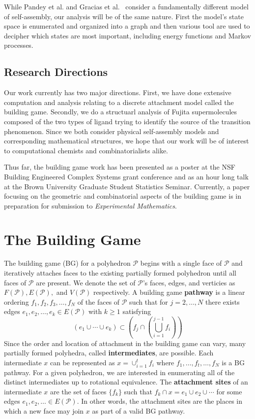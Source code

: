 \documentclass[12pt]{article}
\begin{document}
While Pandey et al. and Gracias et al.~\cite{Pandey2011,Gracias2013} consider a fundamentally different model of self-assembly, our analysis will be of the same nature. First the model's state space is enumerated and organized into a graph and then various tool are used to decipher which states are most important, including energy functions and Markov processes.

\subsection{Research Directions}

Our work currently has two major directions. First, we have done extensive computation and analysis relating to a discrete attachment model called the building game. Secondly, we do a structuarl analysis of Fujita supermolecules composed of the two types of ligand trying to identify the source of the transition phenomenon. Since we both consider physical self-assembly models and corresponding mathematical structures, we hope that our work will be of interest to computational chemists and combinatorialists alike. 

Thus far, the building game work has been presented as a poster at the NSF Building Engineered Complex Systems grant conference and as an hour long talk at the Brown University Graduate Student Statistics Seminar. Currently, a paper focusing on the geometric and combinatorial aspects of the building game is in preparation for submission to \textit{Experimental Mathematics}.

\section{The Building Game}
 The building game (BG) for a polyhedron $\mathcal{P}$ begins with a single face of $\mathcal{P}$ and iteratively attaches faces to the existing partially formed polyhedron until all faces of $\mathcal{P}$ are present. We denote the set of $\mathcal{P}$'s faces, edges, and verticies as $F(\mathcal{P}),E(\mathcal{P}),$ and $V(\mathcal{P})$ respectively. A building game \textbf{pathway} is a linear ordering $f_1,f_2,f_3,\ldots,f_N$ of the faces of $\mathcal{P}$ such that for $j = 2,\ldots,N$ there exists edges $e_1,e_2,\ldots,e_k \in E(\mathcal{P})$ with  $k \geq 1$ satisfying
$$\left(e_1\cup\cdots\cup e_k \right)\subset \left(f_j\cap\left(\bigcup_{i=1}^{j-1}f_i\right)\right)$$
Since the order and location of attachment in the building game can vary, many partially formed polyhedra, called \textbf{intermediates}, are possible. Each intermediate $x$ can be represented as $x = \cup_{i=1}^tf_i$ where $f_1,\ldots,f_t,\ldots,f_N$ is a BG pathway. For a given polyhedron, we are interested in enumerating all of the distinct intermediates up to rotational equivalence. The  \textbf{attachment sites} of an intermediate $x$ are the set of faces $\{f_k\}$ such that $f_k\cap x = e_1\cup e_2 \cup \cdots$ for some edges $e_1,e_2,\ldots \in E(\mathcal{P})$. In other words, the attachment sites are the places in which a new face may join $x$ as part of a valid BG pathway.
\end{document}
